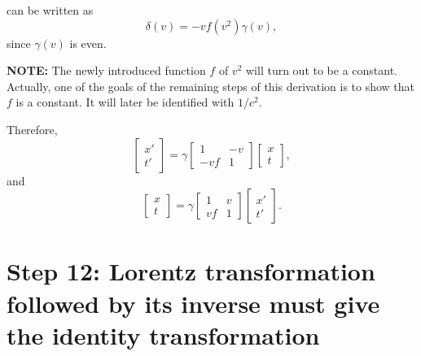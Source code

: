 \documentclass[twocolumn,preprintnumbers,amsmath,amssymb,final]{revtex4}
\def\BEq{\begin{equation}}
\def\EEq{\end{equation}}
\def\d{\delta}
\def\g{\gamma}
\begin{document}
\noindent can be written as
\BEq
\d(v) = -vf(v^2)\g(v),
\EEq
since $\g(v)$ is even. 

\vskip10pt

{\bf NOTE:} The newly introduced function $f$ of $v^2$ will turn out to be a 
constant. Actually, one of the goals of the remaining steps of this derivation is to show that $f$ is a constant. It will later be identified with $1/c^2$.

\vskip10pt

\noindent Therefore,
\BEq
\begin{bmatrix}
x' \\ t'
\end{bmatrix}
=
\g
\begin{bmatrix}
1 & -v  \\
-vf & 1
\end{bmatrix}
\begin{bmatrix}
x \\ t
\end{bmatrix},
\EEq
and
\BEq
\begin{bmatrix}
x \\ t
\end{bmatrix}
=
\g
\begin{bmatrix}
1 & v  \\
vf & 1
\end{bmatrix}
\begin{bmatrix}
x' \\ t'
\end{bmatrix}.
\EEq


\section*{Step 12: Lorentz transformation followed by its inverse must give the identity transformation}
 
\end{document}
